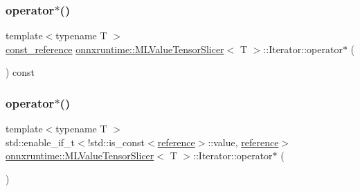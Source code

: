 \mbox{\label{classonnxruntime_1_1MLValueTensorSlicer_1_1Iterator_a64da46bb41ce7eca8e644e31890507c4}} 
\subsubsection{\texorpdfstring{operator$\ast$()}{operator*()}\hspace{0.1cm}{\footnotesize\ttfamily [1/2]}}
{\footnotesize\ttfamily template$<$typename T $>$ \\
\mbox{\hyperlink{classonnxruntime_1_1MLValueTensorSlicer_1_1Iterator_aafbb938cecd84d85c4eef5b9e4332873}{const\+\_\+reference}} \mbox{\hyperlink{classonnxruntime_1_1MLValueTensorSlicer}{onnxruntime\+::\+M\+L\+Value\+Tensor\+Slicer}}$<$ T $>$\+::Iterator\+::operator$\ast$ (\begin{DoxyParamCaption}{ }\end{DoxyParamCaption}) const\hspace{0.3cm}{\ttfamily [inline]}}

\mbox{\label{classonnxruntime_1_1MLValueTensorSlicer_1_1Iterator_a84eeddda16f4d2a08e1ea2bd005ce905}} 
\subsubsection{\texorpdfstring{operator$\ast$()}{operator*()}\hspace{0.1cm}{\footnotesize\ttfamily [2/2]}}
{\footnotesize\ttfamily template$<$typename T $>$ \\
std\+::enable\+\_\+if\+\_\+t$<$!std\+::is\+\_\+const$<$\mbox{\hyperlink{classonnxruntime_1_1MLValueTensorSlicer_1_1Iterator_a528f0b8364b23168f0565c1503b44cd0}{reference}}$>$\+::value, \mbox{\hyperlink{classonnxruntime_1_1MLValueTensorSlicer_1_1Iterator_a528f0b8364b23168f0565c1503b44cd0}{reference}}$>$ \mbox{\hyperlink{classonnxruntime_1_1MLValueTensorSlicer}{onnxruntime\+::\+M\+L\+Value\+Tensor\+Slicer}}$<$ T $>$\+::Iterator\+::operator$\ast$ (\begin{DoxyParamCaption}{ }\end{DoxyParamCaption})\hspace{0.3cm}{\ttfamily [inline]}}

